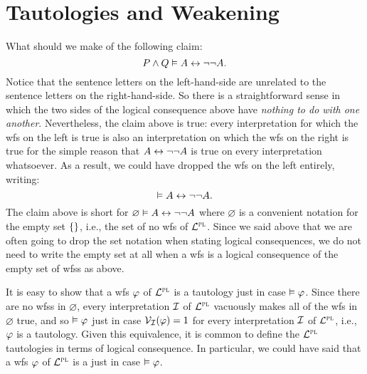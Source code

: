 %
%
%
%




\section{Tautologies and Weakening}
  \label{sec:TautologyWeakening}

What should we make of the following claim:
  $$P\wedge Q \vDash A\leftrightarrow\neg\neg A.$$
Notice that the sentence letters on the left-hand-side are unrelated to the sentence letters on the right-hand-side.
So there is a straightforward sense in which the two sides of the logical consequence above have \emph{nothing to do with one another}.
Nevertheless, the claim above is true: every interpretation for which the wfs on the left is true is also an interpretation on which the wfs on the right is true for the simple reason that $A\leftrightarrow\neg\neg A$ is true on every interpretation whatsoever.
As a result, we could have dropped the wfs on the left entirely, writing:
  $$\vDash A\leftrightarrow\neg\neg A.$$
The claim above is short for $\varnothing\vDash A\leftrightarrow\neg\neg A$ where $\varnothing$ is a convenient notation for the empty set $\lbrace\rbrace$, i.e., the set of no wfs of $\mathcal{L}^{\textsc{pl}}$.
Since we said above that we are often going to drop the set notation when stating logical consequences, we do not need to write the empty set at all when a wfs is a logical consequence of the empty set of wfss as above.

It is easy to show that a wfs $\varphi$ of $\mathcal{L}^{\textsc{pl}}$ is a tautology just in case $\vDash \varphi$. 
Since there are no wfss in $\varnothing$, every interpretation $\mathcal{I}$ of $\mathcal{L}^{\textsc{pl}}$ vacuously makes all of the wfs in $\varnothing$ true, and so $\vDash \varphi$ just in case $\mathcal{V}_{\mathcal{I}}(\varphi) = 1$ for every interpretation $\mathcal{I}$ of $\mathcal{L}^{\textsc{pl}}$, i.e., $\varphi$ is a tautology. 
Given this equivalence, it is common to define the $\mathcal{L}^{\textsc{pl}}$ tautologies in terms of logical consequence.
In particular, we could have said that a wfs $\varphi$ of $\mathcal{L}^{\textsc{pl}}$ is a  just in case $\vDash \varphi$.


